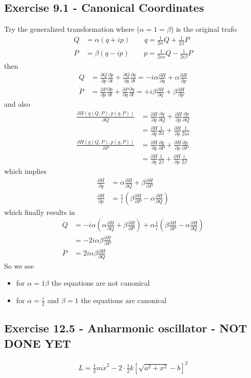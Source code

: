 \documentclass[../main.tex]{subfiles}
\begin{document}
\subsection{Exercise 9.1 - Canonical Coordinates}
Try the generalized transformation where ($\alpha=1=\beta$) is the original trafo
\begin{align}
Q&=\alpha(q+ip)\qquad q=\frac{1}{2\alpha}Q+\frac{1}{2\beta}P\\
P&=\beta(q-ip)\qquad p=\frac{1}{2i\alpha}Q-\frac{1}{2i\beta}P
\end{align}
then
\begin{align}
\dot{Q}&=\frac{\partial Q}{\partial p}\frac{\partial p}{\partial t}+\frac{\partial Q}{\partial q}\frac{\partial q}{\partial t}=-i\alpha\frac{\partial H}{\partial q}+\alpha\frac{\partial H}{\partial p}\\
\dot{P}&=\frac{\partial P}{\partial p}\frac{\partial p}{\partial t}+\frac{\partial P}{\partial q}\frac{\partial q}{\partial t}=+i\beta\frac{\partial H}{\partial q}+\beta\frac{\partial H}{\partial p}
\end{align}
and also
\begin{align}
\frac{\partial H(q(Q,P),p(q,P))}{\partial Q}&=\frac{\partial H}{\partial q}\frac{\partial q}{\partial Q}+\frac{\partial H}{\partial p}\frac{\partial p}{\partial Q}\\
&=\frac{\partial H}{\partial q}\frac{1}{2\alpha}+\frac{\partial H}{\partial p}\frac{1}{2i\alpha}\\
\frac{\partial H(q(Q,P),p(q,P))}{\partial P}&=\frac{\partial H}{\partial q}\frac{\partial q}{\partial P}+\frac{\partial H}{\partial p}\frac{\partial p}{\partial P}\\
&=\frac{\partial H}{\partial q}\frac{1}{2\beta}+\frac{\partial H}{\partial p}\frac{i}{2\beta}
\end{align}
which implies
\begin{align}
\frac{\partial H}{\partial q}&=\alpha\frac{\partial H}{\partial Q}+\beta\frac{\partial H}{\partial P}\\
\frac{\partial H}{\partial p}&=\frac{1}{i}\left(\beta\frac{\partial H}{\partial P}-\alpha\frac{\partial H}{\partial Q}\right)
\end{align}
which finally results in 
\begin{align}
\dot{Q}&=-i\alpha\left(\alpha\frac{\partial H}{\partial Q}+\beta\frac{\partial H}{\partial P}\right)+\alpha\frac{1}{i}\left(\beta\frac{\partial H}{\partial P}-\alpha\frac{\partial H}{\partial Q}\right)\\
&=-2i\alpha\beta\frac{\partial H}{\partial P}\\
\dot{P}&=2i\alpha\beta\frac{\partial H}{\partial Q}
\end{align}
So we see
\begin{itemize}
\item for $\alpha=1\beta$ the equations are not canonical
\item for $\alpha=\frac{i}{2}$  and $\beta=1$ the equations are  canonical
\end{itemize}


\subsection{Exercise 12.5 - Anharmonic oscillator - NOT DONE YET}

\begin{align}
L=\frac{1}{2}m\dot{x}^2-2\cdot\frac{1}{2}k[\sqrt{a^2+x^2}-b]^2
\end{align}
\end{document}
